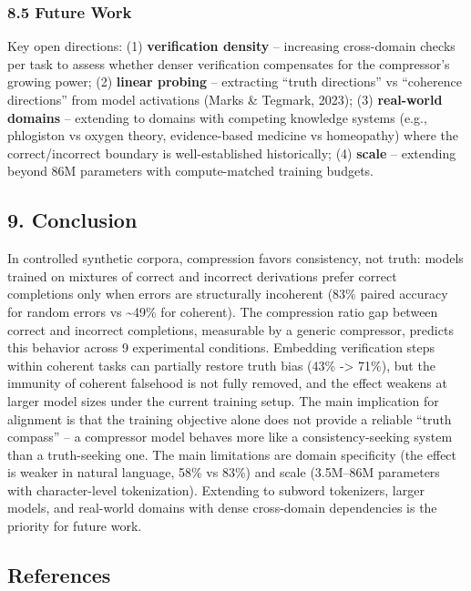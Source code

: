 \documentclass[
  11pt,
]{article}
\begin{document}
\subsubsection{8.5 Future Work}\label{future-work}

Key open directions: (1) \textbf{verification density} -- increasing
cross-domain checks per task to assess whether denser verification
compensates for the compressor's growing power; (2) \textbf{linear
probing} -- extracting ``truth directions'' vs ``coherence directions''
from model activations (Marks \& Tegmark, 2023); (3) \textbf{real-world
domains} -- extending to domains with competing knowledge systems (e.g.,
phlogiston vs oxygen theory, evidence-based medicine vs homeopathy)
where the correct/incorrect boundary is well-established historically;
(4) \textbf{scale} -- extending beyond 86M parameters with
compute-matched training budgets.

\subsection{9. Conclusion}\label{conclusion}

In controlled synthetic corpora, compression favors consistency, not
truth: models trained on mixtures of correct and incorrect derivations
prefer correct completions only when errors are structurally incoherent
(83\% paired accuracy for random errors vs \textasciitilde49\% for
coherent). The compression ratio gap between correct and incorrect
completions, measurable by a generic compressor, predicts this behavior
across 9 experimental conditions. Embedding verification steps within
coherent tasks can partially restore truth bias (43\% -\textgreater{}
71\%), but the immunity of coherent falsehood is not fully removed, and
the effect weakens at larger model sizes under the current training
setup. The main implication for alignment is that the training objective
alone does not provide a reliable ``truth compass'' -- a compressor
model behaves more like a consistency-seeking system than a
truth-seeking one. The main limitations are domain specificity (the
effect is weaker in natural language, 58\% vs 83\%) and scale (3.5M--86M
parameters with character-level tokenization). Extending to subword
tokenizers, larger models, and real-world domains with dense
cross-domain dependencies is the priority for future work.

\subsection{References}\label{references}
\end{document}
